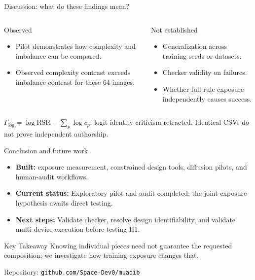 \documentclass[aspectratio=169,11pt]{beamer}
\newcommand{\smallnote}[1]{{\par\vspace{1.5mm}\scriptsize\color{gray!80!black}#1\par}}
\begin{document}
\begin{frame}{Discussion: what do these findings mean?}
\begin{columns}[T,onlytextwidth]
\begin{block}{Observed}
\begin{itemize}\small
  \setlength{\itemsep}{2pt}
  \item Pilot demonstrates how complexity and imbalance can be compared.
  \item Observed complexity contrast exceeds imbalance contrast for these 64 images.
\end{itemize}
\end{block}

\begin{block}{Not established}
\begin{itemize}\small
  \setlength{\itemsep}{2pt}
  \item Generalization across training seeds or datasets.
  \item Checker validity on failures.
  \item Whether full-rule exposure independently causes success.
\end{itemize}
\end{block}
\end{columns}

\vfill
\smallnote{$\Gamma_{\log}=\log\mathrm{RSR}-\sum_p\log c_p$; logit identity criticism retracted. Identical CSVs do not prove independent authorship.}
\end{frame}

\begin{frame}{Conclusion and future work}
\begin{itemize}
  \setlength{\itemsep}{2pt}
  \item \textbf{Built:} exposure measurement, constrained design tools, diffusion pilots, and human-audit workflows.
  \item \textbf{Current status:} Exploratory pilot and audit completed; the joint-exposure hypothesis awaits direct testing.
  \item \textbf{Next steps:} Validate checker, resolve design identifiability, and validate multi-device execution before testing H1.
\end{itemize}

\vspace{2mm}
\begin{block}{Key Takeaway}
\small Knowing individual pieces need not guarantee the requested composition; we investigate how training exposure changes that.
\end{block}

\vfill
\smallnote{Repository: \texttt{github.com/Space-Dev0/muadib}}
\end{frame}
\end{document}
